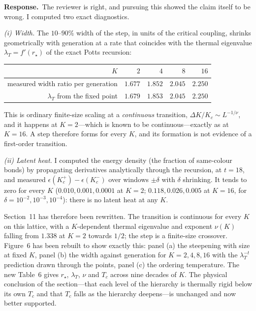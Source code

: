 \documentclass[11pt]{article}
\newcommand{\reply}{\par\noindent\textbf{Response.}\ }
\begin{document}
\reply The reviewer is right, and pursuing this showed the claim itself to be
wrong. I computed two exact diagnostics.

\emph{(i) Width.} The $10$--$90\%$ width of the step, in units of the critical
coupling, shrinks geometrically with generation at a rate that coincides with
the thermal eigenvalue $\lambda_T=f'(r_\star)$ of the exact Potts recursion:

\begin{center}
\begin{tabular}{rrrrr}
\toprule
$K$ & $2$ & $4$ & $8$ & $16$\\
\midrule
measured width ratio per generation & $1.677$ & $1.852$ & $2.045$ & $2.250$\\
$\lambda_T$ from the fixed point     & $1.679$ & $1.853$ & $2.045$ & $2.250$\\
\bottomrule
\end{tabular}
\end{center}

This is ordinary finite-size scaling at a \emph{continuous} transition,
$\Delta K/K_c\sim L^{-1/\nu}$, and it happens at $K=2$---which is known to be
continuous---exactly as at $K=16$. A step therefore forms for every $K$, and
its formation is not evidence of a first-order transition.

\emph{(ii) Latent heat.} I computed the energy density (the fraction of
same-colour bonds) by propagating derivatives analytically through the
recursion, at $t=18$, and measured $\epsilon(K_c^+)-\epsilon(K_c^-)$ over
windows $\pm\delta$ with $\delta$ shrinking. It tends to zero for every $K$
($0.010,0.001,0.0001$ at $K=2$; $0.118,0.026,0.005$ at $K=16$, for
$\delta=10^{-2},10^{-3},10^{-4}$): there is no latent heat at any $K$.

Section~11 has therefore been rewritten. The transition is continuous for every
$K$ on this lattice, with a $K$-dependent thermal eigenvalue and exponent
$\nu(K)$ falling from $1.338$ at $K=2$ towards $1/2$; the step is a finite-size
crossover. Figure~6 has been rebuilt to show exactly this: panel (a) the
steepening with size at fixed $K$, panel (b) the width against generation for
$K=2,4,8,16$ with the $\lambda_T^{-t}$ prediction drawn through the points,
panel (c) the ordering temperature. The new Table~6 gives $r_\star$,
$\lambda_T$, $\nu$ and $T_c$ across nine decades of $K$. The physical
conclusion of the section---that each level of the hierarchy is thermally rigid
below its own $T_c$ and that $T_c$ falls as the hierarchy deepens---is
unchanged and now better supported.
\end{document}
